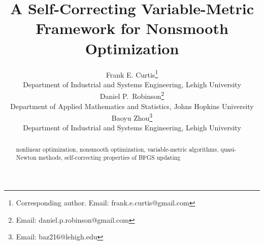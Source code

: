 \documentclass{imanum}
\begin{document}
\title{A Self-Correcting Variable-Metric Framework for Nonsmooth Optimization}

\author{{\sc Frank E. Curtis\thanks{Corresponding author. Email: frank.e.curtis@gmail.com}}\\[2pt]
             Department of Industrial and Systems Engineering, Lehigh University\\[6pt]
        {\sc Daniel P.~Robinson\thanks{Email: daniel.p.robinson@gmail.com}}\\[2pt]
             Department of Applied Mathematics and Statistics, Johns Hopkins University\\[6pt]
        {\sc Baoyu Zhou\thanks{Email: baz216@lehigh.edu}}\\[2pt]
             Department of Industrial and Systems Engineering, Lehigh University}

\maketitle

\begin{abstract}
  {}
  {nonlinear optimization, nonsmooth optimization, variable-metric algorithms, quasi-Newton methods, self-correcting properties of BFGS updating}
\end{abstract}






\end{document}
